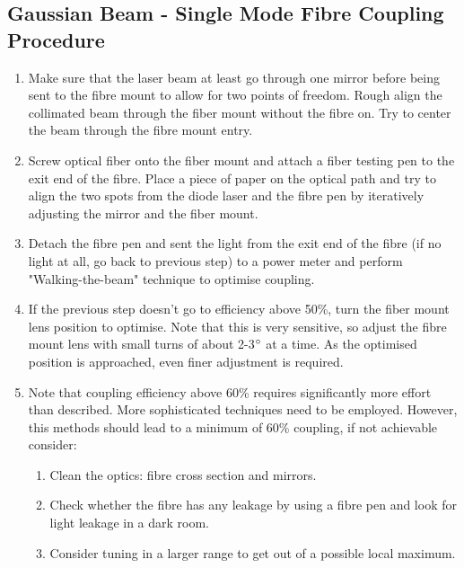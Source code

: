 \documentclass[12pt]{report}
\begin{document}
\subsection{Gaussian Beam - Single Mode Fibre Coupling Procedure} \label{appendix:laerFibreCoupling}
\begin{enumerate}
    \item Make sure that the laser beam at least go through one mirror before being sent to the fibre mount to allow for two points of freedom. Rough align the collimated beam through the fiber mount without the fibre on. Try to center the beam through the fibre mount entry. 
    \item Screw optical fiber onto the fiber mount and attach a fiber testing pen to the exit end of the fibre. Place a piece of paper on the optical path and try to align the two spots from the diode laser and the fibre pen by iteratively adjusting the mirror and the fiber mount. 
    \item Detach the fibre pen and sent the light from the exit end of the fibre (if no light at all, go back to previous step) to a power meter and perform "Walking-the-beam" technique \cite{WalkingTheBeamThorlabs} to optimise coupling. 
    \item If the previous step doesn't go to efficiency above 50\%, turn the fiber mount lens position to optimise. Note that this is very sensitive, so adjust the fibre mount lens with small turns of about 2-3$\degree$ at a time. As the optimised position is approached, even finer adjustment is required. 
    \item Note that coupling efficiency above 60\% requires significantly more effort than described. More sophisticated techniques need to be employed. However, this methods should lead to a minimum of 60\% coupling, if not achievable consider: 
    \begin{enumerate}
        \item Clean the optics: fibre cross section and mirrors.
        \item Check whether the fibre has any leakage by using a fibre pen and look for light leakage in a dark room. 
        \item Consider tuning in a larger range to get out of a possible local maximum. 
    \end{enumerate}
\end{enumerate}
\end{document}
